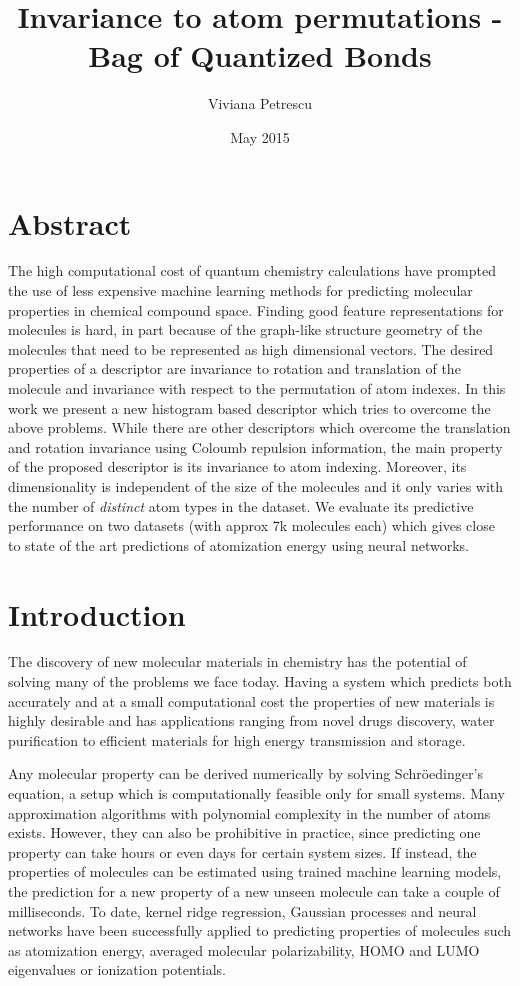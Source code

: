 \documentclass{article}
\title{Invariance to atom permutations - Bag of Quantized Bonds}
\author{Viviana Petrescu }
\date{May 2015}
\begin{document}
\maketitle

\section{Abstract}
The high computational cost of quantum chemistry calculations have prompted the use of less expensive machine learning methods for predicting molecular properties in chemical compound space.
Finding good feature representations for molecules is hard, in part because of the graph-like structure geometry of the molecules that need to be represented as high dimensional vectors. The desired properties of a descriptor are invariance to rotation and translation of the molecule and invariance with respect to the permutation of atom indexes.
In this work we present a new histogram based descriptor which tries to overcome the above problems. While there are other descriptors which overcome the translation and rotation invariance using Coloumb repulsion information, the main property of the proposed descriptor is its invariance to atom indexing. Moreover, its dimensionality is independent of the size of the molecules and it only varies with the number of \textit{distinct} atom types in the dataset.
We evaluate its predictive performance on two datasets (with approx 7k molecules each) which gives close to state of the art predictions of atomization energy using neural networks. 

\section{Introduction}
The discovery of new molecular materials in chemistry has the potential of solving many of the problems we face today.
Having a system which predicts both accurately and at a small computational cost the properties of new materials is highly desirable and has applications ranging from novel drugs discovery, water purification to efficient materials for high energy transmission and storage\cite{cleanenergy}.

Any molecular property can be derived numerically by solving Schröedinger's equation, a setup which is computationally feasible only for small systems. Many approximation algorithms with polynomial complexity in the number of atoms exists. However, they can also be prohibitive in practice, since predicting one property can take hours or even days for certain system sizes.
If instead, the properties of molecules can be estimated using trained machine learning models, the prediction for a new property of a new unseen molecule can take a couple of milliseconds. To date, kernel ridge regression, Gaussian processes and neural networks have been successfully applied to predicting properties of molecules such as atomization energy, averaged molecular polarizability, HOMO and LUMO eigenvalues or ionization potentials.
\end{document}
